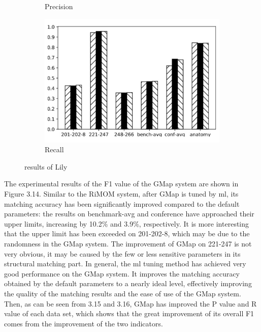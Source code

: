 \documentclass[twoside]{article}
\begin{document}
\begin{figure}[htb!]
\begin{subfigure}{0.3\textwidth}
\caption{Precision}
\label{fig:MultiRegress_LogMap_P}
\end{subfigure}
\begin{subfigure}{0.3\textwidth}
	\centering
\includegraphics[width=\textwidth]{data_figs/MulRegress_LogMap_R.pdf}
\caption{Recall}
\label{fig:MultiRegress_LogMap_R}
\end{subfigure}
\caption{results of Lily}
\end{figure}

The experimental results of the F1 value of the GMap system are shown in Figure 3.14.
Similar to the RiMOM system, after GMap is tuned by ml, its matching accuracy has been significantly improved compared to the default parameters: the results on benchmark-avg and conference have approached their upper limits, increasing by 10.2\% and 3.9\%, respectively.
It is more interesting that the upper limit has been exceeded on 201-202-8, which may be due to the randomness in the GMap system.
The improvement of GMap on 221-247 is not very obvious, it may be caused by the few or less sensitive parameters in its structural matching part.
In general, the ml tuning method has achieved very good performance on the GMap system. It improves the matching accuracy obtained by the default parameters to a nearly ideal level, effectively improving the quality of the matching results and the ease of use of the GMap system.
Then, as can be seen from 3.15 and 3.16, GMap has improved the P value and R value of each data set, which shows that the great improvement of its overall F1 comes from the improvement of the two indicators.
\end{document}
